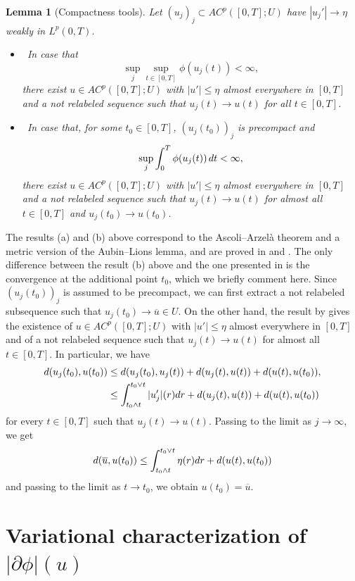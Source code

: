\documentclass[10pt,a4paper]{amsart}
\newcommand{\ove}{\overline}
\renewcommand{\sl}{|\partial \phi|}
\renewcommand{\d}{{\rm d}}
\newtheorem{lemma}[theorem]{Lemma}
\begin{document}
\begin{lemma}[Compactness tools] \label{lemma:compactness} Let $ (u_j)_j \subset  AC^p([0,T];U)$ have
  $|u_j'|\to \eta$ weakly in $L^p(0,T)$.  
  \begin{itemize}
  \item[\rm (a)] \ In case that $$\sup_j \sup_{t \in [0,T]} \phi(u_j(t))<\infty,$$
    there  exist $u \in AC^p([0,T];U)$  with $|u'| \leq \eta$ almost everywhere in
    $[0,T]$  and  a not relabeled sequence such that $u_j(t)\to u(t)$
    for all $t\in [0,T]$.
     \item[\rm (b)] \ In case that, for some $t_0 \in [0,T]$,
       $(u_j(t_0))_j$ is  precompact  and  $$\sup_j\int_0^T \phi(u_j(t))\, \d t<\infty,$$
     there  exist $u \in AC^p([0,T];U)$  with $|u'| \leq \eta$ almost everywhere in
    $[0,T]$   and  a not relabeled sequence such that $u_j(t)\to u(t)$
    for almost all $t\in [0,T]$  and $u_j(t_0) \to u(t_0)$.
  \end{itemize}
\end{lemma}
 The results (a) and (b) above correspond to
  the Ascoli--Arzel\`a theorem  and  a metric version of the Aubin--Lions lemma,   and are proved in
\cite[Prop. 3.3.1]{Ambrosio08} and \cite[Thm.~2]{Rossi-Savare}. 
The only difference between the result (b) above and the one presented
in \cite[Thm.~2]{Rossi-Savare} is the convergence at the additional
point $t_0$, which we briefly comment here. Since $(u_j(t_0))_j$ is
assumed to be  precompact,  we can first extract a not
relabeled subsequence such that $u_j(t_0) \to  \ove u \in U$. 
On the other hand, the result by \cite[Thm.~2]{Rossi-Savare} gives the
existence of $u \in AC^p([0,T];U)$   with $|u'| \leq \eta$ almost
everywhere in $[0,T]$  and  of  a not relabeled sequence such that $u_j(t)\to u(t)$ for almost all $t\in [0,T]$. In particular, we have
\begin{align*}
d(u_j(t_0), u(t_0)) &\le d(u_j(t_0), u_j(t)) + d(u_j(t), u(t))+d(u(t), u(t_0)),
\\
& \le \int_{t_0 \wedge t}^{t_0 \vee t} |u'_j|(r) \d r + d(u_j(t), u(t)) + d(u(t), u(t_0))
\end{align*}
for every $t \in [0,T]$ such that $u_j(t) \to u(t)$. Passing to the limit as $j \to \infty$, we get
\[
d( \ove u  , u(t_0))  \leq   \int_{t_0 \wedge t}^{t_0 \vee t} \eta(r) \d r + d(u(t), u(t_0))
\]
and passing to the limit as $t \to t_0$, we obtain $u(t_0)= \ove u$.


\section{Variational characterization of $\sl(u)$}\label{sec:var}
\end{document}
